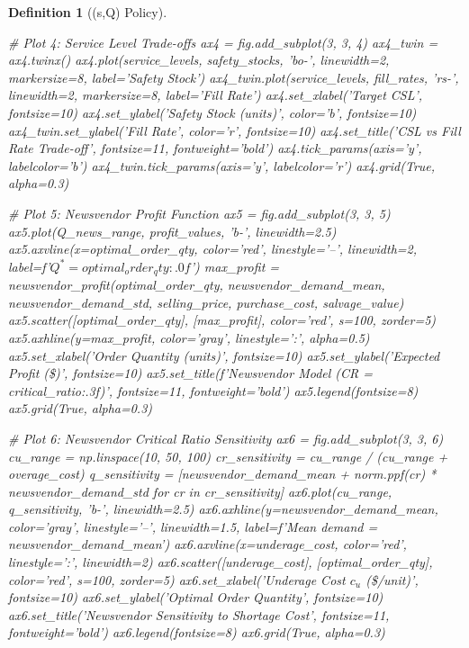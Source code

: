 \documentclass[a4paper, 11pt]{article}
\newtheorem{definition}{Definition}[section]
\begin{document}
\begin{definition}[(s,Q) Policy]
\begin{pycode}
{# Plot 4: Service Level Trade-offs
ax4 = fig.add_subplot(3, 3, 4)
ax4_twin = ax4.twinx()
ax4.plot(service_levels, safety_stocks, 'bo-', linewidth=2, markersize=8, label='Safety Stock')
ax4_twin.plot(service_levels, fill_rates, 'rs-', linewidth=2, markersize=8, label='Fill Rate')
ax4.set_xlabel('Target CSL', fontsize=10)
ax4.set_ylabel('Safety Stock (units)', color='b', fontsize=10)
ax4_twin.set_ylabel('Fill Rate', color='r', fontsize=10)
ax4.set_title('CSL vs Fill Rate Trade-off', fontsize=11, fontweight='bold')
ax4.tick_params(axis='y', labelcolor='b')
ax4_twin.tick_params(axis='y', labelcolor='r')
ax4.grid(True, alpha=0.3)

# Plot 5: Newsvendor Profit Function
ax5 = fig.add_subplot(3, 3, 5)
ax5.plot(Q_news_range, profit_values, 'b-', linewidth=2.5)
ax5.axvline(x=optimal_order_qty, color='red', linestyle='--', linewidth=2,
            label=f'$Q^* = {optimal_order_qty:.0f}$')
max_profit = newsvendor_profit(optimal_order_qty, newsvendor_demand_mean,
                                newsvendor_demand_std, selling_price,
                                purchase_cost, salvage_value)
ax5.scatter([optimal_order_qty], [max_profit], color='red', s=100, zorder=5)
ax5.axhline(y=max_profit, color='gray', linestyle=':', alpha=0.5)
ax5.set_xlabel('Order Quantity (units)', fontsize=10)
ax5.set_ylabel('Expected Profit (\$)', fontsize=10)
ax5.set_title(f'Newsvendor Model (CR = {critical_ratio:.3f})', fontsize=11, fontweight='bold')
ax5.legend(fontsize=8)
ax5.grid(True, alpha=0.3)

# Plot 6: Newsvendor Critical Ratio Sensitivity
ax6 = fig.add_subplot(3, 3, 6)
cu_range = np.linspace(10, 50, 100)
cr_sensitivity = cu_range / (cu_range + overage_cost)
q_sensitivity = [newsvendor_demand_mean + norm.ppf(cr) * newsvendor_demand_std
                 for cr in cr_sensitivity]
ax6.plot(cu_range, q_sensitivity, 'b-', linewidth=2.5)
ax6.axhline(y=newsvendor_demand_mean, color='gray', linestyle='--', linewidth=1.5,
            label=f'Mean demand = {newsvendor_demand_mean}')
ax6.axvline(x=underage_cost, color='red', linestyle=':', linewidth=2)
ax6.scatter([underage_cost], [optimal_order_qty], color='red', s=100, zorder=5)
ax6.set_xlabel('Underage Cost $c_u$ (\$/unit)', fontsize=10)
ax6.set_ylabel('Optimal Order Quantity', fontsize=10)
ax6.set_title('Newsvendor Sensitivity to Shortage Cost', fontsize=11, fontweight='bold')
ax6.legend(fontsize=8)
ax6.grid(True, alpha=0.3)

}
\end{pycode}
\end{definition}
\end{document}
